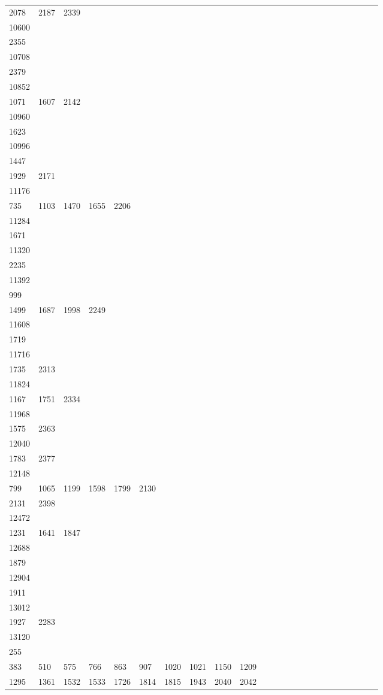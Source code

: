 \begin{longtable}{*{24}{l}}
2078& 2187& 2339& \\
10600&&&&&&&&&\\
2355& \\
10708&&&&&&&&&\\
2379& \\
10852&&&&&&&&&\\
1071& 1607& 2142& \\
10960&&&&&&&&&\\
1623& \\
10996&&&&&&&&&\\
1447\\
1929& 2171& \\
11176&&&&&&&&&\\
735& 1103& 1470& 1655& 2206& \\
11284&&&&&&&&&\\
1671& \\
11320&&&&&&&&&\\
2235& \\
11392&&&&&&&&&\\
999\\
1499& 1687& 1998& 2249& \\
11608&&&&&&&&&\\
1719& \\
11716&&&&&&&&&\\
1735& 2313& \\
11824&&&&&&&&&\\
1167& 1751& 2334\\
11968&&&&&&&&&\\
1575& 2363& \\
12040&&&&&&&&&\\
1783& 2377& \\
12148&&&&&&&&&\\
799& 1065& 1199& 1598& 1799& 2130\\
2131& 2398& \\
12472&&&&&&&&&\\
1231& 1641& 1847& \\
12688&&&&&&&&&\\
1879& \\
12904&&&&&&&&&\\
1911& \\
13012&&&&&&&&&\\
1927& 2283& \\
13120&&&&&&&&&\\
255\\
383& 510& 575& 766& 863& 907& 1020& 1021& 1150& 1209\\
1295& 1361& 1532& 1533& 1726& 1814& 1815& 1943& 2040& 2042\\

\end{longtable}
